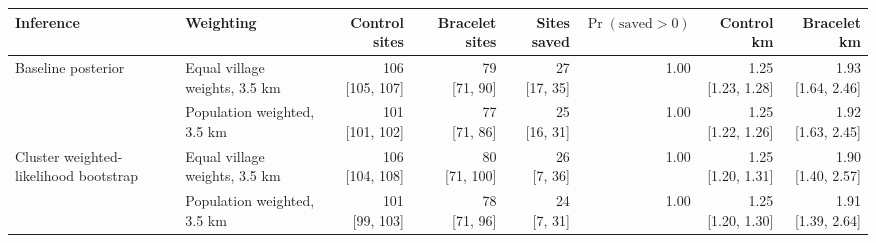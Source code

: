 \begin{tabular}{llrrrrrr}
\toprule
Inference & Weighting & Control sites & Bracelet sites & Sites saved & $\Pr(\text{saved}>0)$ & Control km & Bracelet km \\
\midrule
Baseline posterior & Equal village weights, 3.5 km & \makecell[c]{106\\{}[105, 107]} & \makecell[c]{79\\{}[71, 90]} & \makecell[c]{27\\{}[17, 35]} & 1.00 & \makecell[c]{1.25\\{}[1.23, 1.28]} & \makecell[c]{1.93\\{}[1.64, 2.46]} \\
 & Population weighted, 3.5 km & \makecell[c]{101\\{}[101, 102]} & \makecell[c]{77\\{}[71, 86]} & \makecell[c]{25\\{}[16, 31]} & 1.00 & \makecell[c]{1.25\\{}[1.22, 1.26]} & \makecell[c]{1.92\\{}[1.63, 2.45]} \\
\addlinespace
Cluster weighted-likelihood bootstrap & Equal village weights, 3.5 km & \makecell[c]{106\\{}[104, 108]} & \makecell[c]{80\\{}[71, 100]} & \makecell[c]{26\\{}[7, 36]} & 1.00 & \makecell[c]{1.25\\{}[1.20, 1.31]} & \makecell[c]{1.90\\{}[1.40, 2.57]} \\
 & Population weighted, 3.5 km & \makecell[c]{101\\{}[99, 103]} & \makecell[c]{78\\{}[71, 96]} & \makecell[c]{24\\{}[7, 31]} & 1.00 & \makecell[c]{1.25\\{}[1.20, 1.30]} & \makecell[c]{1.91\\{}[1.39, 2.64]} \\
\bottomrule
\end{tabular}
